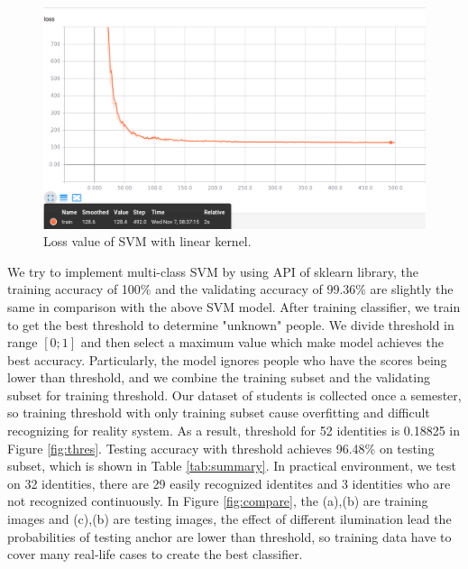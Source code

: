 \documentclass[journal, twocolumn]{IEEEtran}
\begin{document}
\begin{figure}
    \centering
    \includegraphics[width=1\linewidth]{img/loss.png}
	\caption{Loss value of SVM with linear kernel.}
	\label{fig:loss}
\end{figure}
We try to implement multi-class SVM by using API of sklearn library, the training accuracy of 100\% and the validating accuracy of 99.36\% are slightly the same in comparison with the above SVM model. After training classifier, we train to get the best threshold to determine "unknown" people. We divide threshold in range $[0;1]$ and then select a maximum value which make model achieves the best accuracy. Particularly, the model ignores people who have the scores being lower than threshold, and we combine the training subset and the validating subset for training threshold. Our dataset of students is collected once a semester, so training threshold with only training subset cause overfitting and difficult recognizing for reality system. As a result, threshold for 52 identities is 0.18825 in Figure \ref{fig:thres}. Testing accuracy with threshold achieves 96.48\% on testing subset, which is shown in Table \ref{tab:summary}. In practical environment, we test on 32 identities, there are 29 easily recognized identites and 3 identities who are not recognized continuously. In Figure \ref{fig:compare}, the (a),(b) are training images and (c),(b) are testing images, the effect of different ilumination lead the probabilities of testing anchor are lower than threshold, so training data have to cover many real-life cases to create the best classifier.  
\end{document}

